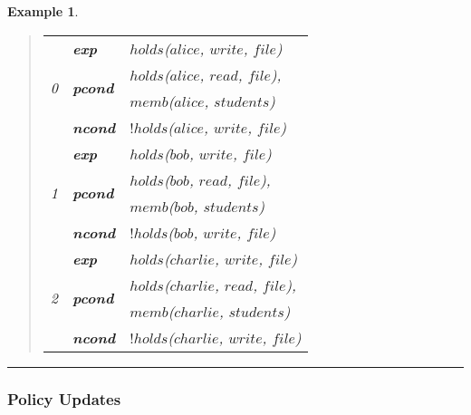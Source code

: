 \documentclass[10pt, twocolumn]{article}
\newtheorem{examp}{Example}
\newenvironment{example}{\begin{examp}\rm}{\rule{2mm}{2mm}\end{examp}}
\begin{document}
\begin{example}
          \begin{quote}
            \begin{tabular}[t]{|l|l|l|}
              \hline
              \multirow{4}{*}{0} &
              \textbf{exp} &
              $holds$($alice$, $write$, $file$) \\
              \cline{2-3}
              & 
              \multirow{2}{*}{\textbf{pcond}} &
              $holds$($alice$, $read$, $file$), \\
              &
              &
              $memb$($alice$, $students$) \\
              \cline{2-3}
              & \textbf{ncond} & $!holds$($alice$, $write$, $file$) \\
              \hline
              \hline
              \multirow{4}{*}{1} &
              \textbf{exp} &
              $holds$($bob$, $write$, $file$) \\
              \cline{2-3}
              & 
              \multirow{2}{*}{\textbf{pcond}} &
              $holds$($bob$, $read$, $file$), \\
              &
              &
              $memb$($bob$, $students$) \\
              \cline{2-3}
              & \textbf{ncond} & $!holds$($bob$, $write$, $file$) \\
              \hline
              \hline
              \multirow{4}{*}{2} &
              \textbf{exp} &
              $holds$($charlie$, $write$, $file$) \\
              \cline{2-3}
              & 
              \multirow{2}{*}{\textbf{pcond}} &
              $holds$($charlie$, $read$, $file$), \\
              &
              &
              $memb$($charlie$, $students$) \\
              \cline{2-3}
              & \textbf{ncond} & $!holds$($charlie$, $write$, $file$) \\
              \hline
            \end{tabular}
          \end{quote}
        \end{example}

      \subsubsection{Policy Updates}
\end{document}
